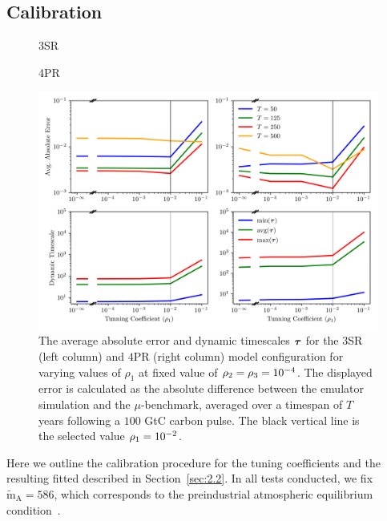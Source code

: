 \documentclass[11pt, a4paper, pdftex, twoside, dvipsnames]{article}
\renewcommand{\ref}{\cref}
\newcommand{\bb}[1]{\boldsymbol{\bold{#1}}}
\newcommand{\bbt}[1]{\tilde{\boldsymbol{\mathrm{#1}}}}
\newcommand{\expnum}[2]{
\ifnum#1=1 
  10^{#2} 
\else 
  #1 \! \cdot \! 10^{#2}
\fi
}
\begin{document}
\subsection{Calibration} \label{sec:2.3}
\begin{figure}[b]
\noindent %
\begin{minipage}{0.5\textwidth}
	\noindent
	\centering
	\hspace{3em}\small{\textsc{3SR}}
\end{minipage}%
\begin{minipage}{0.5\textwidth}
	\noindent
	\centering
	\small{\textsc{4PR}}
\end{minipage}
\includegraphics[width=\textwidth]{fig/analysis_rho_1_sel.png}
\caption{
The average absolute error and dynamic timescales $\bb{\tau}$ for the $3$SR (left column) and $4$PR (right column) model configuration for varying values of $\rho_1$ at fixed value of $\rho_2=\rho_3=\expnum{1}{-4}$.
%
The displayed error is calculated as the absolute difference between the emulator simulation and the $\mu$-benchmark, averaged  over a timespan of $T$ years following a $100$ GtC carbon pulse.
%
The black vertical line is the selected value $\rho_1=\expnum{1}{-2}$.
%
}
\label{fig:rho_1_motiv}
\end{figure}
%
Here we outline the calibration procedure for the tuning coefficients and the resulting fitted described in Section~\ref{sec:2.2}.
%
In all tests conducted, we fix $\bbt{m}_{\text{A}}=586$, which corresponds to the preindustrial atmospheric equilibrium condition~\cite{IPCC_carbon_cycle}.
\end{document}

